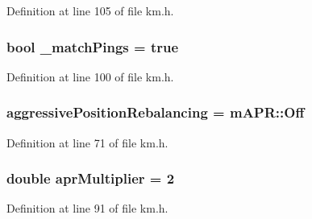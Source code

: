 Definition at line 105 of file km.\+h.

\subsubsection[{\texorpdfstring{\+\_\+match\+Pings}{_matchPings}}]{\setlength{\rightskip}{0pt plus 5cm}bool \+\_\+match\+Pings = true}\hypertarget{struct_k_1_1m_quoting_params_a61446b4fb2c9d0703a4d2de65887792b}{}\label{struct_k_1_1m_quoting_params_a61446b4fb2c9d0703a4d2de65887792b}


Definition at line 100 of file km.\+h.

\subsubsection[{\texorpdfstring{aggressive\+Position\+Rebalancing}{aggressivePositionRebalancing}}]{ aggressive\+Position\+Rebalancing = {\bf m\+A\+P\+R\+::\+Off}}\hypertarget{struct_k_1_1m_quoting_params_abce7d5d8bfe5b74771f69e8371ad8fb6}{}\label{struct_k_1_1m_quoting_params_abce7d5d8bfe5b74771f69e8371ad8fb6}


Definition at line 71 of file km.\+h.

\subsubsection[{\texorpdfstring{apr\+Multiplier}{aprMultiplier}}]{\setlength{\rightskip}{0pt plus 5cm}double apr\+Multiplier = 2}\hypertarget{struct_k_1_1m_quoting_params_a66807d8fce3feefad4ba68f020d50bf5}{}\label{struct_k_1_1m_quoting_params_a66807d8fce3feefad4ba68f020d50bf5}


Definition at line 91 of file km.\+h.

